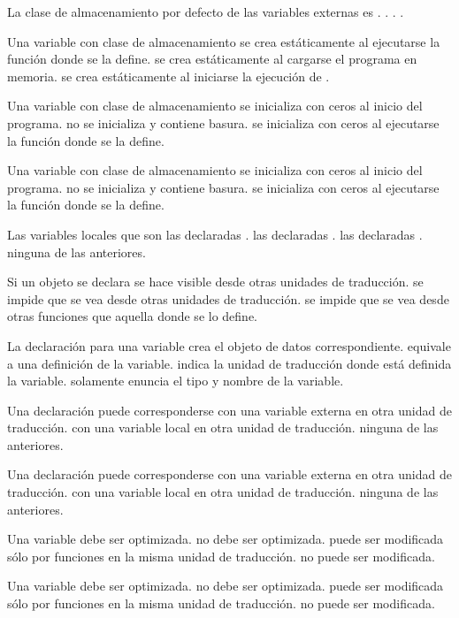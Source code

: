 \begin{preguntas}
\question La clase de almacenamiento por defecto de las variables externas es
\choice {}.
\correctchoice {}.
\choice {}.
\choice {}.

\question Una variable con clase de almacenamiento  
\choice se crea estáticamente al ejecutarse la función donde se la define.
\correctchoice se crea estáticamente al cargarse el programa en memoria.
\choice se crea estáticamente al iniciarse la ejecución de .

\question Una variable con clase de almacenamiento  
\correctchoice se inicializa con ceros al inicio del programa.
\choice no se inicializa y contiene basura.
\choice se inicializa con ceros al ejecutarse la función donde se la define.

\question Una variable con clase de almacenamiento 
\choice se inicializa con ceros al inicio del programa.
\correctchoice no se inicializa y contiene basura.
\choice se inicializa con ceros al ejecutarse la función donde se la define.

\question Las variables locales que  son
\choice las declaradas .
\correctchoice las declaradas .
\choice las declaradas .
\choice ninguna de las anteriores.

\question Si un objeto se declara 
\choice se hace visible desde otras unidades de traducción.
\correctchoice se impide que se vea desde otras unidades de traducción.
\choice se impide que se vea desde otras funciones que aquella donde se lo define.

\question La declaración  para una variable
\choice crea el objeto de datos correspondiente.
\choice equivale a una definición de la variable.
\choice indica la unidad de traducción donde está definida la variable.
\correctchoice solamente enuncia el tipo y nombre de la variable.

\question Una declaración  puede corresponderse
\correctchoice con una variable externa en otra unidad de traducción.
\choice con una variable local en otra unidad de traducción.
\choice ninguna de las anteriores.

\question Una declaración  puede corresponderse
\choice con una variable externa en otra unidad de traducción.
\choice con una variable local en otra unidad de traducción.
\correctchoice ninguna de las anteriores.

\question Una variable  
\choice debe ser optimizada.
\choice no debe ser optimizada.
\choice puede ser modificada sólo por funciones en la misma unidad de traducción.
\correctchoice no puede ser modificada.

\question Una variable  
\choice debe ser optimizada.
\correctchoice no debe ser optimizada.
\choice puede ser modificada sólo por funciones en la misma unidad de traducción.
\choice no puede ser modificada.
\end{preguntas}
